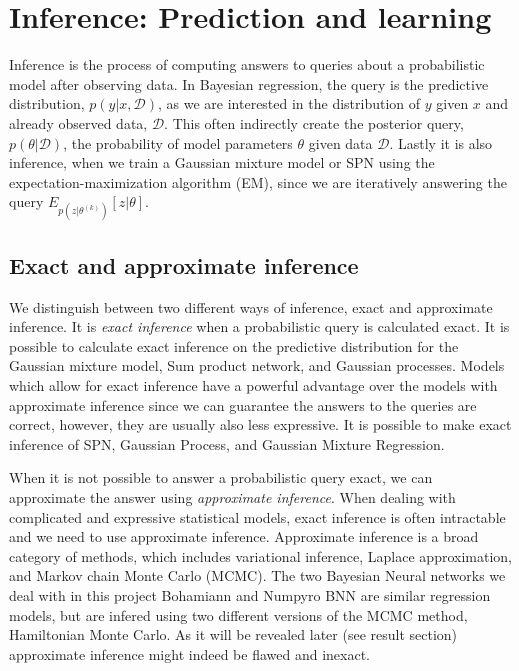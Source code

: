 \chapter{Inference: Prediction and learning}
Inference is the process of computing answers to queries about a probabilistic model after observing data. 
In Bayesian regression, the
query is the predictive distribution, $p(y|x,\mathcal{D})$, as we are interested in the distribution of $y$ given $x$ 
and already observed data, $\mathcal{D}$. 
This often indirectly create the posterior query, $p(\theta|\mathcal{D})$, the probability of model parameters $\theta$ given data
$\mathcal{D}$. Lastly it is also inference, when we train 
a Gaussian mixture model or SPN using the expectation-maximization algorithm (EM), since we are iteratively answering the query
$E_{p(z|\theta^{(k)})}[z|\theta]$.

\section{Exact and approximate inference}
We distinguish between two different ways of inference, exact and approximate inference.
It is \textit{exact inference} when a probabilistic query is calculated exact. It is possible to calculate exact inference on 
the predictive distribution for the Gaussian mixture model, Sum product network, and Gaussian processes. Models which allow 
for exact inference have a powerful advantage over the models with approximate inference since we can guarantee
 the answers to the queries are
correct, however, they are usually also less expressive. It is possible to
make exact inference of SPN, Gaussian Process, and Gaussian Mixture Regression. 

When it is not possible to answer a probabilistic query exact, we can approximate the
answer using \textit{approximate inference}. When dealing with complicated and expressive statistical models, exact inference is often
intractable and we need to use approximate inference. Approximate inference 
is a broad category of methods, which includes 
variational inference, Laplace approximation, and Markov chain Monte Carlo (MCMC).
The two Bayesian Neural networks we deal with in this project Bohamiann and Numpyro BNN are
similar regression models, but are infered using two different versions of the MCMC 
method, Hamiltonian Monte Carlo. As it will be revealed later (see result section) 
approximate inference might indeed be flawed and inexact. 

